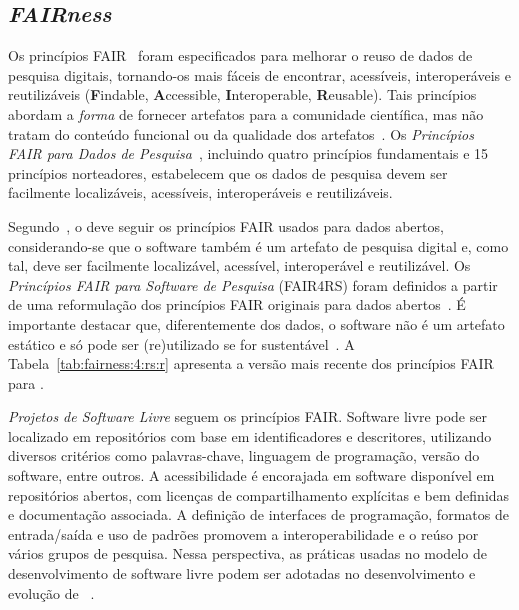 \subsection{\textit{FAIRness}}
\label{subsection:fair:software}


Os princípios FAIR~\cite{Wilkinson2016} foram especificados para melhorar o reuso de dados de pesquisa digitais, tornando-os mais fáceis de encontrar, acessíveis, interoperáveis e reutilizáveis (\textbf{F}indable, \textbf{A}ccessible, \textbf{I}nteroperable, \textbf{R}eusable).
%
Tais princípios abordam a \textit{forma} de fornecer artefatos para a comunidade científica, mas não tratam do conteúdo funcional ou da qualidade dos artefatos~\cite{lamprecht:2020}.
Os \textit{Princípios FAIR para Dados de Pesquisa}~\cite{Wilkinson2016}, 
incluindo quatro princípios fundamentais e 15 princípios norteadores, estabelecem que os dados de pesquisa devem ser facilmente localizáveis, acessíveis, interoperáveis e reutilizáveis. 

Segundo~\cite{chue_hong_fair_2022}, o \RSw deve seguir os princípios FAIR usados para dados abertos, considerando-se que
o software também é um artefato de pesquisa digital e, como tal, deve ser facilmente localizável, acessível, interoperável e reutilizável. 
%
Os \textit{Princípios FAIR para Software de Pesquisa} (FAIR4RS) foram definidos a partir de uma reformulação dos princípios FAIR originais para dados abertos~\cite{lamprecht:2020,chue_hong_fair_2022,barker:2022}.
É importante destacar que, diferentemente dos dados, o software não é um artefato estático e só pode ser (re)utilizado se for sustentável~\cite{lamprecht:2020}.
%
A Tabela~\ref{tab:fairness:4:rs:r} apresenta a versão mais recente dos princípios FAIR para \RS.

\textit{Projetos de Software Livre} seguem os princípios FAIR. %
Software livre pode ser localizado em repositórios com base em identificadores e descritores, utilizando diversos critérios como palavras-chave, linguagem de programação, versão do software, entre outros. 
A acessibilidade é encorajada em software disponível em repositórios abertos, com licenças de compartilhamento explícitas e bem definidas e documentação associada. 
A definição de interfaces de programação, formatos de entrada/saída e uso de padrões promovem a interoperabilidade e o reúso por vários grupos de pesquisa.
Nessa perspectiva, as práticas usadas no modelo de desenvolvimento de software livre podem ser adotadas no desenvolvimento e evolução de \RS~\cite{flach:sbc:2021}. 

